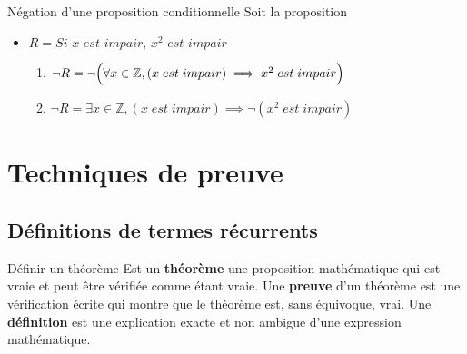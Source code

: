 \documentclass[16pt]{report}
\begin{document}
\begin{multicols*}{2}
            \begin{EExample}{Négation d'une proposition conditionnelle}{}
                Soit la proposition
                \begin{itemize}
                    \item  $R = \textit{Si  $x$ est impair, $x^2$ est impair}$  
                        \begin{enumerate}
                            \item $\neg R = \neg \Bigl(\forall x \in \mathbb{Z}, 
                                (x \; est \; impair) \implies  x^2 \; est \; impair\Bigr)$
                            \item $\neg R = \exists x \in \mathbb{Z}, 
                                (x \; est \; impair) \implies  \neg (x^2 \; est \;  impair)$ 
                        \end{enumerate}
                \end{itemize}

            \end{EExample}




            
            \chapter{Techniques de preuve}
            

            \section{Définitions de termes récurrents} 


            \begin{Definitionx}{Définir un théorème}{}
                        Est un \textbf{théorème} une proposition mathématique qui est vraie et peut être vérifiée comme 
                        étant vraie. Une \textbf{preuve} d'un théorème est une vérification écrite qui montre que le 
                        théorème est, sans équivoque, vrai. Une \textbf{définition} est une explication exacte et 
                        non ambigue d'une expression mathématique. 
            \end{Definitionx}                                                                                            
            

\end{multicols*}
\end{document}

